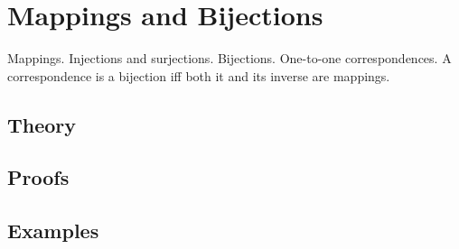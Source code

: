 
\section{Mappings and Bijections}
\label{sec:2.2.03-mappings-bijections}

\begin{ticket}
Mappings. Injections and surjections. Bijections. One-to-one correspondences. A correspondence is a bijection iff both it and its inverse are mappings.
\end{ticket}

\subsection*{Theory}

\subsection*{Proofs}

\subsection*{Examples}
